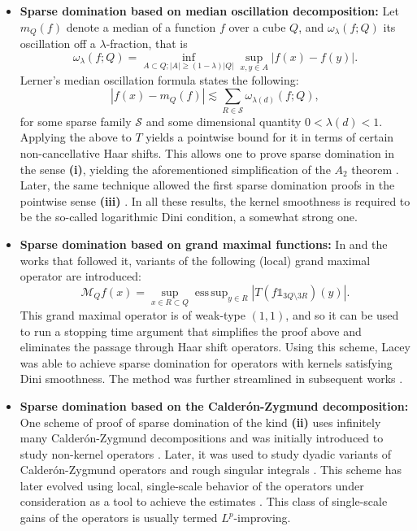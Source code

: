 \documentclass[12pt]{amsart}
\newcommand{\one}{\mathds{1}}
\DeclareMathOperator*{\esssup}{ess\,sup}
\newcommand{\Ss}{\mathcal{S}}
\theoremstyle{plain}
\theoremstyle{definition} %
\numberwithin{equation}{section}
\begin{document}
\begin{itemize}
    \item \textbf{Sparse domination based on median oscillation decomposition:} Let $m_Q(f)$ denote a median of a function $f$ over a cube $Q$, and $\omega_\lambda(f;Q)$ its oscillation off a $\lambda$-fraction, that is
    $$
    \omega_\lambda(f;Q)= \inf_{A \subset Q; |A| \geq (1-\lambda)|Q|} \sup_{x,y\in A}|f(x)-f(y)|.
    $$
    Lerner's median oscillation formula states the following:
    $$
    |f(x)-m_Q(f)| \lesssim \sum_{R \in \Ss}\omega_{\lambda(d)}(f;Q),
    $$
    for some sparse family $\Ss$ and some dimensional quantity $0<\lambda(d)<1$. Applying the above to $T$ yields a pointwise bound for it in terms of certain non-cancellative Haar shifts. This allows one to prove sparse domination in the sense \textbf{(i)}, yielding the aforementioned simplification of the $A_2$ theorem \cite{Le2013,Le2013b}. Later, the same technique allowed the first sparse domination proofs in the pointwise sense \textbf{(iii)} \cite{CAR2016,LeNa2019}. In all these results, the kernel smoothness is required to be the so-called logarithmic Dini condition, a somewhat strong one. 
    \item \textbf{Sparse domination based on grand maximal functions:} In \cite{La2017} and the works that followed it, variants of the following (local) grand maximal operator are introduced:
    $$
    \mathcal{M}_{Q}f(x) = \sup_{x\in R \subset Q} \esssup_{y \in R}|T(f\one_{3Q\setminus 3R})(y)|.
    $$
    This grand maximal operator is of weak-type $(1,1)$, and so it can be used to run a stopping time argument that simplifies the proof above and eliminates the passage through Haar shift operators. Using this scheme, Lacey was able to achieve sparse domination for operators with kernels satisfying Dini smoothness. The method was further streamlined in subsequent works \cite{Le2016,LeO2020}.
    \item \textbf{Sparse domination based on the Calder\'on-Zygmund decomposition:} One scheme of proof of sparse domination of the kind \textbf{(ii)} uses infinitely many Calder\'on-Zygmund decompositions and was initially introduced to study non-kernel operators \cite{BFP2016}. Later, it was used to study dyadic variants of Calder\'on-Zygmund operators \cite{CuDPOu2018} and rough singular integrals \cite{CACDPO2017}. This scheme has later evolved using local, single-scale behavior of the operators under consideration as a tool to achieve the estimates \cite{BRS2024}. This class of single-scale gains of the operators is usually termed $L^p$-improving. 
\end{itemize}
\end{document}
